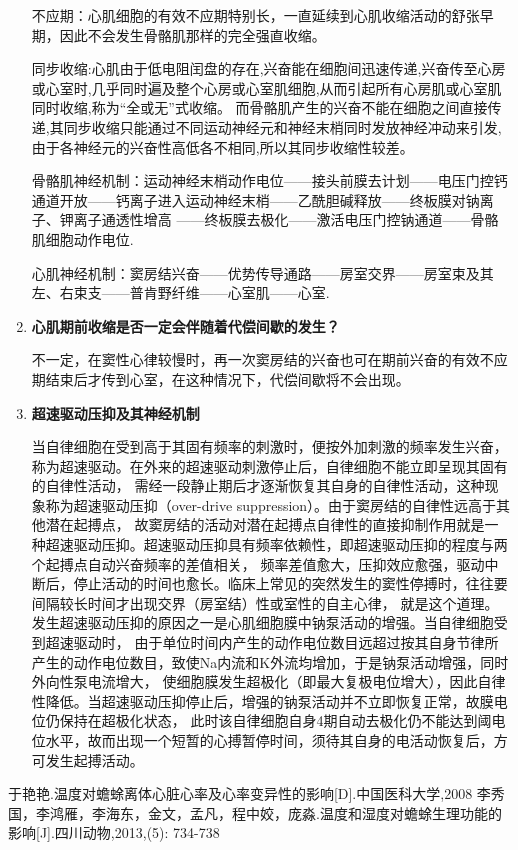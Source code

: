\documentclass[UTF8]{article}
\begin{document}
\begin{enumerate}
{          不应期：心肌细胞的有效不应期特别长，一直延续到心肌收缩活动的舒张早期，因此不会发生骨骼肌那样的完全强直收缩。

          同步收缩:心肌由于低电阻闰盘的存在,兴奋能在细胞间迅速传递,兴奋传至心房或心室时,几乎同时遍及整个心房或心室肌细胞,从而引起所有心房肌或心室肌同时收缩,称为“全或无”式收缩。
          而骨骼肌产生的兴奋不能在细胞之间直接传递,其同步收缩只能通过不同运动神经元和神经末梢同时发放神经冲动来引发,由于各神经元的兴奋性高低各不相同,所以其同步收缩性较差。

          骨骼肌神经机制：运动神经末梢动作电位——接头前膜去计划——电压门控钙通道开放——钙离子进入运动神经末梢——乙酰胆碱释放——终板膜对钠离子、钾离子通透性增高
          ——终板膜去极化——激活电压门控钠通道——骨骼肌细胞动作电位.

          心肌神经机制：窦房结兴奋——优势传导通路——房室交界——房室束及其左、右束支——普肯野纤维——心室肌——心室.
        }
        \item {
          \textbf{心肌期前收缩是否一定会伴随着代偿间歇的发生？}

          不一定，在窦性心律较慢时，再一次窦房结的兴奋也可在期前兴奋的有效不应期结束后才传到心室，在这种情况下，代偿间歇将不会出现。
        }
        \item {
          \textbf{超速驱动压抑及其神经机制}

          当自律细胞在受到高于其固有频率的刺激时，便按外加刺激的频率发生兴奋，称为超速驱动。在外来的超速驱动刺激停止后，自律细胞不能立即呈现其固有的自律性活动，
          需经一段静止期后才逐渐恢复其自身的自律性活动，这种现象称为超速驱动压抑（over-drive suppression）。由于窦房结的自律性远高于其他潜在起搏点，
          故窦房结的活动对潜在起搏点自律性的直接抑制作用就是一种超速驱动压抑。超速驱动压抑具有频率依赖性，即超速驱动压抑的程度与两个起搏点自动兴奋频率的差值相关，
          频率差值愈大，压抑效应愈强，驱动中断后，停止活动的时间也愈长。临床上常见的突然发生的窦性停搏时，往往要间隔较长时间才出现交界（房室结）性或室性的自主心律，
          就是这个道理。发生超速驱动压抑的原因之一是心肌细胞膜中钠泵活动的增强。当自律细胞受到超速驱动时，
          由于单位时间内产生的动作电位数目远超过按其自身节律所产生的动作电位数目，致使Na内流和K外流均增加，于是钠泵活动增强，同时外向性泵电流增大，
          使细胞膜发生超极化（即最大复极电位增大），因此自律性降低。当超速驱动压抑停止后，增强的钠泵活动并不立即恢复正常，故膜电位仍保持在超极化状态，
          此时该自律细胞自身4期自动去极化仍不能达到阈电位水平，故而出现一个短暂的心搏暂停时间，须待其自身的电活动恢复后，方可发生起搏活动。
        }
    \end{enumerate}
    \begin{thebibliography}{99}  
        于艳艳.温度对蟾蜍离体心脏心率及心率变异性的影响[D].中国医科大学,2008
        李秀国，李鸿雁，李海东，金文，孟凡，程中姣，庞淼.温度和湿度对蟾蜍生理功能的影响[J].四川动物,2013,(5): 734-738
    \end{thebibliography}
\end{document}
